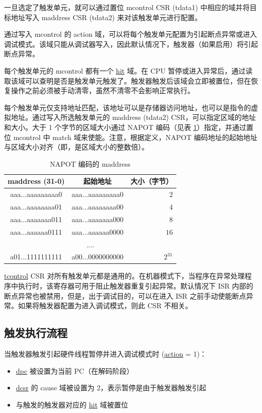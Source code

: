 \documentclass[main\_\_CN.tex]{subfiles}
\begin{document}
一旦选定了触发单元，就可以通过置位 mcontrol CSR (tdata1) 中相应的域并将目标地址写入 maddress CSR (tdata2) 来对该触发单元进行配置。

通过写入 mcontrol 的 action 域，可以将每个触发单元配置为引起断点异常或进入调试模式。该域只能从调试器写入，因此默认情况下，触发器（如果启用）将引起断点异常。

每个触发单元的 mcontrol 都有一个 \hyperref[fielddesc:MCONTROLHIT]{hit} 域。在 CPU 暂停或进入异常后，通过读取该域可以查明是否是触发单元触发了。触发器触发后该域会立即被置位，但在恢复操作之前必须被手动清零，虽然不清零不会影响正常执行。

每个触发单元仅支持地址匹配，该地址可以是存储器访问地址，也可以是指令的虚拟地址。通过写入所选触发单元的 maddress (tdata2) CSR，可以指定区域的地址和大小。大于 1 个字节的区域大小通过 NAPOT 编码（见表 \ref{tab:riscvcpu-hwt-table}）指定，并通过置位 mcontrol 中 match 域来使能。注意，根据定义，NAPOT 编码地址的起始地址与区域大小对齐（即，是区域大小的整数倍）。

\begin{longtable}{ | c | c | r | }
\caption{NAPOT 编码的 maddress} \label{tab:riscvcpu-hwt-table}
\\ \hline
\rowcolor{lightgray}
maddress (31-0) & 起始地址 & 大小（字节） \\ \hline
aaa...aaaaaaaaa0 & aaa...aaaaaaaaa0 & $2$ \\ \hline
aaa...aaaaaaaa01 & aaa...aaaaaaaa00 & $4$ \\ \hline
aaa...aaaaaaa011 & aaa...aaaaaaa000 & $8$ \\ \hline
aaa...aaaaaa0111 & aaa...aaaaaa0000 & $16$ \\ \hline
\multicolumn{3}{c}{....} \\ \hline
a01...1111111111 & a00...0000000000 & $2^{31}$ \\ \hline
\end{longtable}

\hyperref[regdesc:TCONTROL]{tcontrol} CSR 对所有触发单元都是通用的。在机器模式下，当程序在异常处理程序中执行时，该寄存器可用于阻止触发器重复引起异常。默认情况下 ISR 内部的断点异常也被禁用，但是，出于调试目的，可以在进入 ISR 之前手动使能断点异常。如果将触发器配置为进入调试模式，则此 CSR 不相关。

\subsection{触发执行流程}
\label{sec:riscvcpu-hwt-suggest-op}

当触发器触发引起硬件线程暂停并进入调试模式时 (\hyperref[fielddesc:MCONTROLACTION]{action} = 1)：
\begin{itemize}
    \item \hyperref[regdesc:DPC]{dpc} 被设置为当前 PC（在解码阶段）
    \item \hyperref[regdesc:DCSR]{dcsr} 的 cause 域被设置为 2，表示暂停是由于触发器触发引起
    \item 与触发的触发器对应的 \hyperref[fielddesc:MCONTROLHIT]{hit} 域被置位
\end{itemize}
\end{document}
